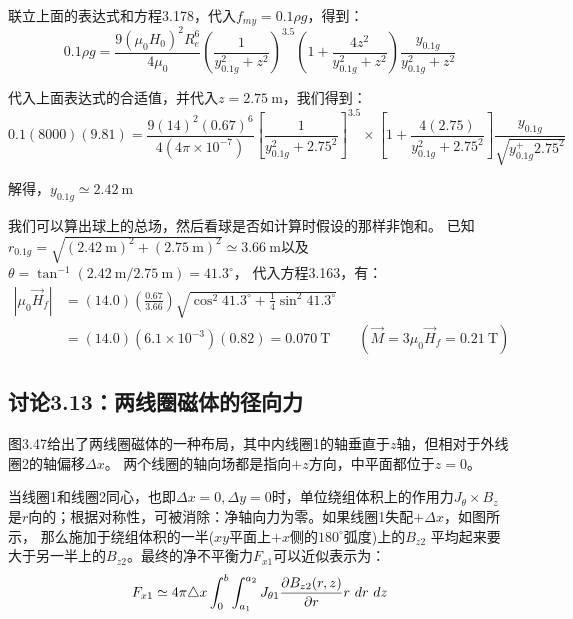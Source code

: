 联立上面的表达式和方程3.178，代入$f_{my}=0.1\rho g$，得到：
\begin{equation*}
0.1\rho g=\frac{9(\mu_0 H_0)^2R_e^6}{4\mu_0}(\frac{1}{y_{0.1g}^2+z^2})^{3.5}(1+\frac{4z^2}{y_{0.1g}^2+z^2})\frac{y_{0.1g}}{y_{0.1g}^2+z^2}
\end{equation*}

代入上面表达式的合适值，并代入$z=2.75\ \mathrm{m}$，我们得到：
\begin{equation*}
0.1(8000)(9.81)=\frac{9(14)^2(0.67)^6}{4(4\pi\times 10^{-7})}[\frac{1}{y_{0.1g}^2+2.75^2}]^{3.5}\times[1+\frac{4(2.75)}{y_{0.1g}^2+2.75^2}]\frac{y_{0.1g}}{\sqrt{y_{0.1g}^+2.75^2}}
\end{equation*}

解得，$y_{0.1g}\simeq 2.42\ \mathrm{m}$

我们可以算出球上的总场，然后看球是否如计算时假设的那样非饱和。
已知$r_{0.1g} =\sqrt{(2.42 \ \mathrm{m})^2+(2.75\ \mathrm{m})^2}\simeq 3.66 \ \mathrm{m}$以及$\theta = \tan^{−1}(2.42\ \mathrm{m}/2.75\ \mathrm{m}) = 41.3^\circ$，
代入方程3.163，有：
\begin{equation*}
\begin{split}
|\mu_0 \vec{H}_f|&=(14.0)(\frac{0.67}{3.66})\sqrt{\cos^2 41.3^\circ+\frac{1}{4}\sin^2 41.3^\circ}\\
&=(14.0)(6.1\times 10^{-3})(0.82)=0.070\ \mathrm{T}\qquad(\vec{M}=3\mu_0\vec{H}_f=0.21\ \mathrm{T})
\end{split}
\end{equation*}


\subsection{讨论3.13：两线圈磁体的径向力}
图3.47给出了两线圈磁体的一种布局，其中内线圈1的轴垂直于$z$轴，但相对于外线圈2的轴偏移$\Delta x$。
两个线圈的轴向场都是指向$+z$方向，中平面都位于$z=0$。

当线圈1和线圈2同心，也即$\Delta x=0,\Delta y=0$时，单位绕组体积上的作用力$J_\theta \times B_z$
是$r$向的；根据对称性，可被消除：净轴向力为零。如果线圈1失配$+\Delta x$，如图所示，
那么施加于绕组体积的一半($xy$平面上$+x$侧的$180^\circ$弧度)上的$B_{z2}$
平均起来要大于另一半上的$B_{z2}$。最终的净不平衡力$F_{x1}$可以近似表示为：
\begin{equation}%
F_{x1}\simeq4\pi\triangle x\int_{0}^{b}\int_{a_{1}}^{a_{2}}J_{\theta1}\frac{\partial B_{z2}(r,z)}{\partial r}r\ dr\ dz\\
\end{equation}

